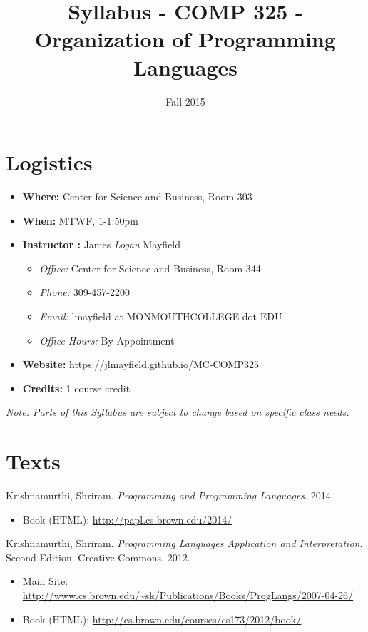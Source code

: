 \documentclass[10pt]{article}
\title{Syllabus - COMP 325 - Organization of Programming Languages}
\author{  }
\date{Fall 2015}
\begin{document}
\maketitle

\section{Logistics}
\begin{itemize}
\item \textbf{Where: } Center for Science and Business, Room 303
\item \textbf{When: } MTWF,  1-1:50pm
\item \textbf{Instructor :} James \textit{Logan} Mayfield
\begin{itemize}
\item \textit{Office: } Center for Science and Business, Room 344
\item \textit{Phone: } 309-457-2200
\item \textit{Email: } lmayfield at MONMOUTHCOLLEGE dot EDU
\item \textit{Office Hours: } By Appointment
\end{itemize}
\item \textbf{Website: } \url{https://jlmayfield.github.io/MC-COMP325}
\item \textbf{Credits: } 1 course credit
\end{itemize}
\emph{Note: Parts of this Syllabus are subject to change based on specific class needs.}

\section{Texts}
Krishnamurthi, Shriram. \textit{Programming and Programming Languages}. 2014. 
\begin{itemize}
\item Book (HTML): \url{http://papl.cs.brown.edu/2014/}
\end{itemize}

\vspace{.2in} 

\noindent
Krishnamurthi, Shriram. \textit{Programming Languages Application and Interpretation}. Second Edition. Creative Commons. 2012. 
\begin{itemize}
\item Main Site: \url{http://www.cs.brown.edu/~sk/Publications/Books/ProgLangs/2007-04-26/}
\item Book (HTML): \url{http://cs.brown.edu/courses/cs173/2012/book/}
\end{itemize}
\end{document}
